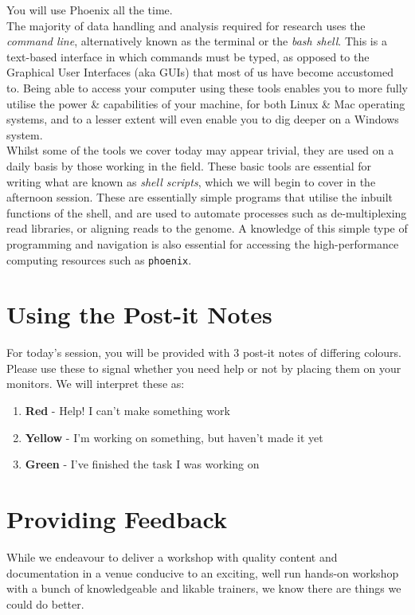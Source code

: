 You will use Phoenix all the time. \\

The majority of data handling and analysis required for research uses the \textit{command line}, alternatively known as the terminal or the \textit{bash shell}.
This is a text-based interface in which commands must be typed, as opposed to the Graphical User Interfaces (aka GUIs) that most of us have become accustomed to.
Being able to access your computer using these tools enables you to more fully utilise the power \& capabilities of your machine, for both Linux \& Mac operating systems, and to a lesser extent will even enable you to dig deeper on a Windows system.\\

Whilst some of the tools we cover today may appear trivial, they are used on a daily basis by those working in the field.
These basic tools are essential for writing what are known as \textit{shell scripts}, which we will begin to cover in the afternoon session.
These are essentially simple programs that utilise the inbuilt functions of the shell, and are used to automate processes such as de-multiplexing read libraries, or aligning reads to the genome.
A knowledge of this simple type of programming and navigation is also essential for accessing the high-performance computing resources such as \texttt{phoenix}.\\

\section{Using the Post-it Notes}
For today's session, you will be provided with 3 post-it notes of differing colours.
Please use these to signal whether you need help or not by placing them on your monitors.
We will interpret these as:
\begin{enumerate}
	\item \textbf{Red} - Help! I can't make something work
	\item \textbf{Yellow} - I'm working on something, but haven't made it yet
	\item \textbf{Green} - I've finished the task I was working on
\end{enumerate}

\section{Providing Feedback}
While we endeavour to deliver a workshop with quality content and documentation in a venue conducive to an exciting, well run hands-on workshop with a bunch of knowledgeable and likable
trainers, we know there are things we could do better.

